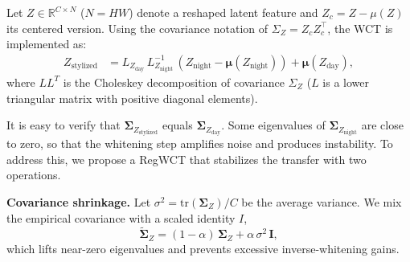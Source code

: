 \documentclass{article}
\begin{document}

Let $Z \in \mathbb{R}^{C \times N}$ ($N = HW$) denote a reshaped latent feature and $Z_c = Z - {\mu}(Z)$ its centered version. Using the covariance notation of ${\Sigma}_Z = Z_c Z_c^{\!\top}$, the WCT is implemented as:
\begin{equation}
\begin{aligned}
 Z_{\text{stylized}} 
    &= {L}_{Z_{\text{day}}}\, {L}_{Z_{\text{night}}}^{-1}\,(Z_{\text{night}} - \bm{\mu}(Z_{\text{night}})) + \bm{\mu}(Z_{\text{day}}),
\end{aligned}   
\end{equation}
where $LL^T$ is the Choleskey decomposition of covariance ${\Sigma}_Z$ ($L$ is a lower triangular matrix with positive diagonal elements).

It is easy to verify that $\bm{\Sigma}_{Z_{\text{stylized}}}$ equals $\bm{\Sigma}_{Z_{\text{day}}}$. Some eigenvalues of $\bm{\Sigma}_{Z_{\text{night}}}$ are close to zero, so that the whitening step amplifies noise and produces instability. To address this, we propose a RegWCT that stabilizes the transfer with two operations.

\noindent\textbf{Covariance shrinkage.}
Let ${\sigma^2} = \mathrm{tr}(\bm{\Sigma}_Z)/C$ be the average variance. We mix the empirical covariance with a scaled identity $I$,
\begin{equation}
    \widetilde{\bm{\Sigma}}_Z = (1 - \alpha)\, \bm{\Sigma}_Z + \alpha\, {\sigma^2}\, \bm{I}, 
\end{equation}
which lifts near-zero eigenvalues and prevents excessive inverse-whitening gains.
\end{document}
